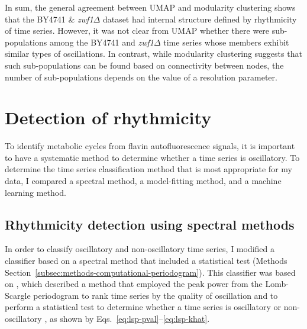 In sum, the general agreement between UMAP and modularity clustering shows that the BY4741 \& \textit{zwf1$\Delta$} dataset had internal structure defined by rhythmicity of time series.
However, it was not clear from UMAP whether there were sub-populations among the BY4741 and \textit{zwf1$\Delta$} time series whose members exhibit similar types of oscillations.
In contrast, while modularity clustering suggests that such sub-populations can be found based on connectivity between nodes, the number of sub-populations depends on the value of a resolution parameter.


\section{Detection of rhythmicity}
\label{sec:analysis-classification}

To identify metabolic cycles from flavin autofluorescence signals, it is important to have a systematic method to determine whether a time series is oscillatory.
To determine the time series classification method that is most appropriate for my data, I compared a spectral method, a model-fitting method, and a machine learning method.


\subsection{Rhythmicity detection using spectral methods}
\label{subsec:analysis-classification-spectral}

In order to classify oscillatory and non-oscillatory time series, I modified a classifier based on a spectral method that included a statistical test (Methods Section~\ref{subsec:methods-computational-periodogram}).
This classifier was based on \textcite{glynnDetectingPeriodicPatterns2006}, which described a method that employed the peak power from the Lomb-Scargle periodogram \parencite{lombLeastsquaresFrequencyAnalysis1976} to rank time series by the quality of oscillation and to perform a statistical test to determine whether a time series is oscillatory or non-oscillatory \parencite{scargleStudiesAstronomicalTime1982}, as shown by Eqs.\ \ref{eq:lsp-pval}--\ref{eq:lsp-khat}.

